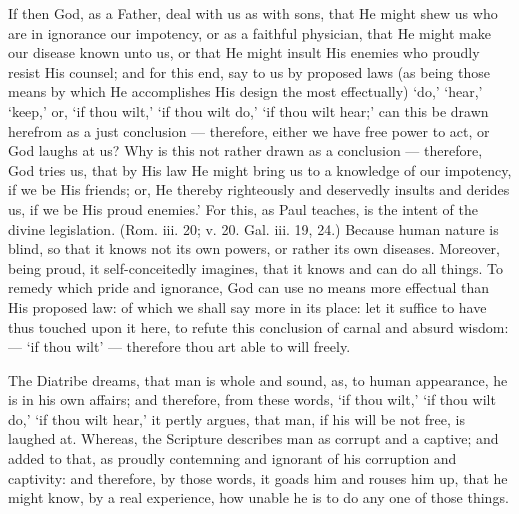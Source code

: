 If then God, as a Father, deal with us as with sons, that He might shew us who are in ignorance our impotency, or as a faithful physician, that He might make our disease known unto us, or that He might insult His enemies who proudly resist His counsel; and for this end, say to us by proposed laws (as being those means by which He accomplishes His design the most effectually) ‘do,’ ‘hear,’ ‘keep,’ or, ‘if thou wilt,’ ‘if thou wilt do,’ ‘if thou wilt hear;’ can this be drawn herefrom as a just conclusion — therefore, either we have free power to act, or God laughs at us? Why is this not rather drawn as a conclusion — therefore, God tries us, that by His law He might bring us to a knowledge of our impotency, if we be His friends; or, He thereby righteously and deservedly insults and derides us, if we be His proud enemies.’ For this, as Paul teaches, is the intent of the divine legislation. (Rom. iii. 20; v. 20. Gal. iii. 19, 24.) Because human nature is blind, so that it knows not its own powers, or rather its own diseases. Moreover, being proud, it self-conceitedly imagines, that it knows and can do all things. To remedy which pride and ignorance, God can use no means more effectual than His proposed law: of which we shall say more in its place: let it suffice to have thus touched upon it here, to refute this conclusion of carnal and absurd wisdom: — ‘if thou wilt’ — therefore thou art able to will freely.

The Diatribe dreams, that man is whole and sound, as, to human appearance, he is in his own affairs; and therefore, from these words, ‘if thou wilt,’ ‘if thou wilt do,’ ‘if thou wilt hear,’ it pertly argues, that man, if his will be not free, is laughed at. Whereas, the Scripture describes man as corrupt and a captive; and added to that, as proudly contemning and ignorant of his corruption and captivity: and therefore, by those words, it goads him and rouses him up, that he might know, by a real experience, how unable he is to do any one of those things.


